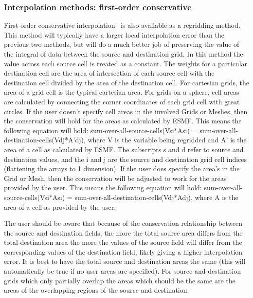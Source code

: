 \subsubsection{Interpolation methods: first-order conservative}\label{sec:interpolation:conserve}
 First-order conservative interpolation~\cite{ConservativeOrder1} is also available as a regridding method. This method 
 will typically have  
 a larger local interpolation error than the previous two methods, but will do a much better job of preserving the value
 of the  integral of data between the source and destination grid. In this method the value across each source cell
 is treated as a constant. The weights for a particular destination cell are the area of intersection of each 
 source cell with the destination cell divided by the area of the destination cell. For cartesian grids, the area of a grid cell is the typical cartesian area. 
 For grids on a sphere, cell areas are calculated by connecting the corner coordinates of each grid cell with great circles. If the user doesn't specify
 cell areas in the involved Grids or Meshes, then the conservation will hold for the areas as calculated by 
 ESMF. This means the following equation will hold:  sum-over-all-source-cells(Vsi*Asi) = sum-over-all-destination-cells(Vdj*A'dj), where
 V is the variable being regridded and A' is the area of a cell as calculated by ESMF.  The subscripts s and d refer to source and destination values, and the i and j are the source 
 and destination grid cell indices (flattening the arrays to 1 dimension). If the user does specify the area's in the Grid or Mesh, then the conservation will be adjusted to work for the areas 
 provided by the user. This means the following equation will hold:  sum-over-all-source-cells(Vsi*Asi) = sum-over-all-destination-cells(Vdj*Adj),
 where A is the area of a cell as provided by the user. 

 The user should be aware that because of the conservation relationship between the source and destination fields, the more the total source area
 differs from the total destination area the more the values of the source field will differ from the corresponding values of the destination field, likely giving a higher 
 interpolation error. It is best to have the total source and destination areas the same (this will automatically be true if no user areas are specified). For source and destination grids 
 which only partially overlap the areas which should be the same are the areas of the overlapping regions of the source and destination. 


